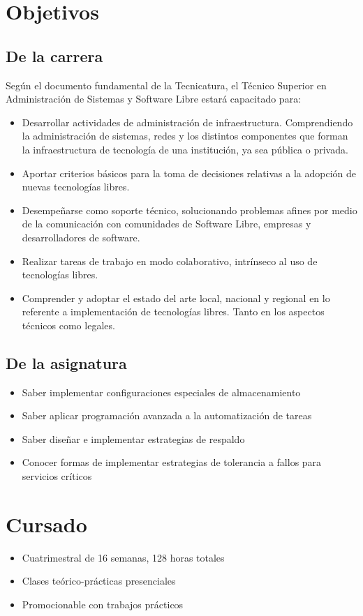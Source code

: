 
\section{Objetivos}
\subsection{De la carrera}
Según el documento fundamental de la Tecnicatura, el Técnico Superior en Administración de Sistemas y Software Libre estará capacitado para:
\begin{itemize}
	\item Desarrollar actividades de administración de infraestructura. Comprendiendo la administración de sistemas, redes y los distintos componentes que forman la
infraestructura de tecnología de una institución, ya sea pública o privada.
	\item Aportar criterios básicos para la toma de decisiones relativas a la adopción de nuevas tecnologías libres.
	\item Desempeñarse como soporte técnico, solucionando problemas afines por medio de la comunicación con comunidades de Software Libre, empresas y desarrolladores de
software.
	\item Realizar tareas de trabajo en modo colaborativo, intrínseco al uso de tecnologías libres.
	\item Comprender y adoptar el estado del arte local, nacional y regional en lo referente a implementación de tecnologías libres. Tanto en los aspectos técnicos como legales.
\end{itemize}
\subsection{De la asignatura}

\begin{itemize}
	\item Saber implementar configuraciones especiales de almacenamiento
	\item Saber aplicar programación avanzada a la automatización de tareas
	\item Saber diseñar e implementar estrategias de respaldo 
	\item Conocer formas de implementar estrategias de tolerancia a fallos para servicios críticos
\end{itemize}


\section{Cursado}
\begin{itemize}
	\item Cuatrimestral de 16 semanas, 128 horas totales
	\item Clases teórico-prácticas presenciales
	\item Promocionable con trabajos prácticos
\end{itemize}


